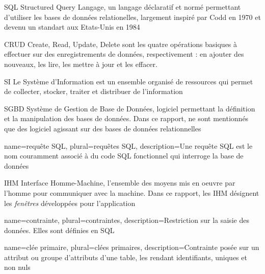         {SQL}
        {Structured Query Langage, un langage déclaratif et normé permettant d'utiliser les bases de données relationelles, largement inspiré par Codd en 1970 et devenu un standart aux Etats-Unis en 1984}

                           {CRUD}
                           {Create, Read, Update, Delete sont les quatre opérations basiques à effectuer sur des enregistrements de données, respectivement : en ajouter des nouveaux, les lire, les mettre à jour et les effacer.}

                           {SI}
                           {Le Système d'Information est un ensemble organisé de ressources qui permet de collecter, stocker, traiter et distribuer de l'information}

                           {SGBD}
                           {Système de Gestion de Base de Données, logiciel permettant la définition et la manipulation des bases de données. Dans ce rapport, ne sont mentionnés que des logiciel agissant sur des bases de données relationnelles}

        {name={requête SQL},
        plural={requêtes SQL},
        description={Une requête SQL est le nom couramment associé à du code SQL fonctionnel qui interroge la base de données}}

	{IHM}
	{Interface Homme-Machine, l'ensemble des moyens mis en oeuvre par l'homme pour communiquer avec la machine.
	Dans ce rapport, les IHM désignent les \textit{fenêtres} développées pour l'application}

        {name={contrainte},
        plural={contraintes},
        description={Restriction sur la saisie des données. Elles sont définies en SQL}}

        {name={clée primaire},
        plural={clées primaires},
        description={Contrainte posée sur un attribut ou groupe d'attributs d'une table, les rendant identifiants, uniques et non nuls}}


